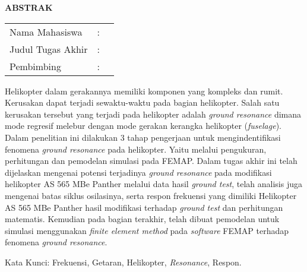 \begin{center}
  \large\textbf{ABSTRAK}
\end{center}


\vspace{2ex}

\begingroup
\setlength{\tabcolsep}{0pt}

\noindent
\begin{tabularx}{\textwidth}{l >{\centering}m{2em} X}
  Nama Mahasiswa    & : & \name{}         \\

  Judul Tugas Akhir & : & \tatitle{}      \\

  Pembimbing        & : & \advisor{}   \\
  
\end{tabularx}
\endgroup

Helikopter dalam gerakannya memiliki komponen yang kompleks dan rumit. Kerusakan dapat terjadi sewaktu-waktu pada bagian helikopter. Salah satu kerusakan tersebut yang terjadi pada helikopter adalah \textit{ground resonance} dimana mode regresif melebur dengan mode gerakan kerangka helikopter (\textit{fuselage}). Dalam penelitian ini dilakukan 3 tahap pengerjaan untuk mengindentifikasi fenomena \textit{ground resonance} pada helikopter. Yaitu melalui pengukuran, perhitungan dan pemodelan simulasi pada FEMAP. Dalam tugas akhir ini telah dijelaskan mengenai potensi terjadinya \textit{ground resonance} pada modifikasi helikopter AS 565 MBe Panther melalui data hasil \textit{ground test}, telah analisis juga mengenai batas siklus osilasinya, serta respon frekuensi yang dimiliki Helikopter AS 565 MBe Panther hasil modifikasi terhadap \textit{ground test} dan perhitungan matematis. Kemudian pada bagian terakhir, telah dibuat pemodelan untuk simulasi menggunakan \textit{finite element method} pada \textit{software} FEMAP terhadap fenomena \textit{ground resonance}.

Kata Kunci: Frekuensi, Getaran, Helikopter, \textit{Resonance}, Respon.